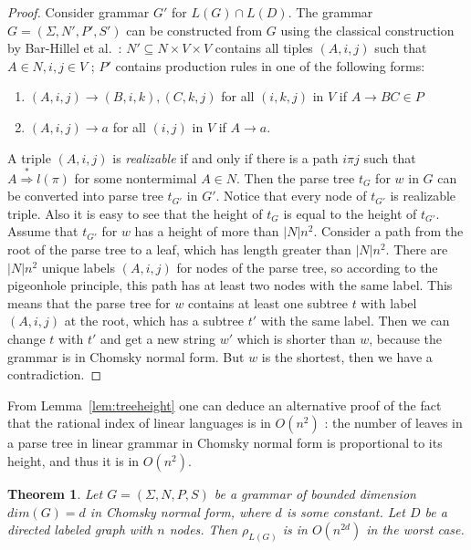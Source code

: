 \documentclass[11pt,a4paper]{article} %
\newtheorem{theorem}{Theorem}
\begin{document}
\begin{proof}
Consider grammar $G'$ for $L(G)\cap L(D)$. The grammar $G = (\Sigma, N', P', S')$ can be constructed from $G$ using the classical construction by Bar-Hillel et al.~\cite{BarHillel}: $N' \subseteq N \times V \times V $  contains all tiples $(A, i, j)$ such that $A \in N, i, j \in V$ ; $P'$ contains production rules in one of the following forms:
\begin{enumerate}
\item $(A, i, j) \rightarrow (B, i, k), (C, k, j)$ for all $(i, k, j)$ in $V$  if $A \rightarrow BC \in P$
\item $(A, i, j) \rightarrow a$ for all $(i, j)$ in $V$ if $A \rightarrow a$.
\end{enumerate}
A triple $(A, i, j)$ is \textit{realizable} if and only if there is a path $i\pi j$ such that $A \stackrel {*}{\Rightarrow } l(\pi)$ for some nontermimal $A \in N$. Then the parse tree $t_G$ for $w$ in $G$ can be converted into parse tree $t_{G'}$ in $G'$. Notice that every node of $t_{G'}$ is realizable triple. Also it is easy to see that the height of $t_G$ is equal to the height of $t_{G'}$. Assume that $t_{G'}$ for $w$ has a height of more than $|N|n^2$. Consider a path from the root of the parse tree to a leaf, which has length greater than $|N|n^2$. There are $|N|n^2$ unique labels $(A, i, j)$ for nodes of the parse tree, so according to the pigeonhole principle, this path has at least two nodes with the same label. This means that the parse tree for $w$ contains at least one subtree $t$ with label $(A, i, j)$ at the root, which has a subtree $t'$ with the same label. Then we can change $t$ with $t'$ and get a new string $w'$ which is shorter than $w$, because the grammar is in Chomsky normal form. But $w$ is the shortest, then we have a contradiction.
\end{proof}
From Lemma~\ref{lem:treeheight} one can deduce an alternative proof of the fact that the rational index of linear languages is in $O(n^2)$ \cite{RatBasic}: the number of leaves in a parse tree in linear grammar in Chomsky normal form is proportional to its height, and thus it is in $O(n^2)$.
\begin{theorem}
\label{oscbnddim}
Let $G = (\Sigma, N, P, S)$ be a grammar of bounded dimension $dim(G) = d$ in Chomsky normal form, where $d$ is some constant. Let $D$ be a directed labeled graph with $n$ nodes. Then $\rho_{L(G)}$ is in $O(n^{2d})$ in the worst case.
\end{theorem}
\end{document}
